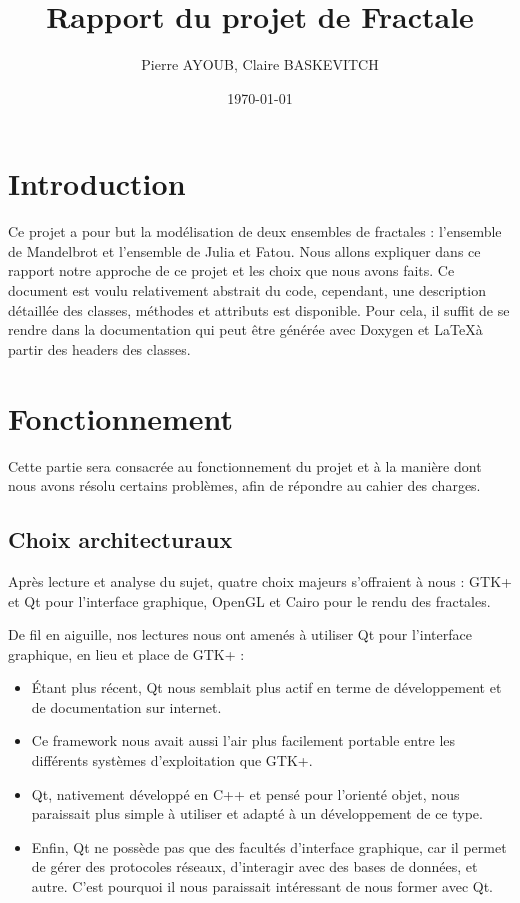 \documentclass[11pt]{article}
\title{Rapport du projet de Fractale}
\author{Pierre AYOUB, Claire BASKEVITCH}
\date\today
\begin{document}
\maketitle

\section{Introduction}

Ce projet a pour but la modélisation de deux ensembles de fractales : l'ensemble
de Mandelbrot et l'ensemble de Julia et Fatou. Nous allons expliquer dans ce
rapport notre approche de ce projet et les choix que nous avons faits. Ce
document est voulu relativement abstrait du code, cependant, une description
détaillée des classes, méthodes et attributs est disponible. Pour cela, il
suffit de se rendre dans la documentation qui peut être générée avec Doxygen et
\LaTeX à partir des headers des classes.

\section{Fonctionnement}

Cette partie sera consacrée au fonctionnement du projet et à la manière dont
nous avons résolu certains problèmes, afin de répondre au cahier des charges.

\subsection{Choix architecturaux}

Après lecture et analyse du sujet, quatre choix majeurs s'offraient à nous :
GTK+ et Qt pour l'interface graphique, OpenGL et Cairo pour le rendu des
fractales.

De fil en aiguille, nos lectures nous ont amenés à utiliser Qt pour l'interface
graphique, en lieu et place de GTK+ :
\begin{itemize}
    \item Étant plus récent, Qt nous semblait plus actif en terme de
        développement et de documentation sur internet.
    \item Ce framework nous avait aussi l'air plus facilement portable entre les
        différents systèmes d'exploitation que GTK+.
    \item Qt, nativement développé en C++ et pensé pour l'orienté objet, nous
        paraissait plus simple à utiliser et adapté à un développement de ce
        type.
    \item Enfin, Qt ne possède pas que des facultés d'interface graphique, car
        il permet de gérer des protocoles réseaux, d'interagir avec des bases de
        données, et autre. C'est pourquoi il nous paraissait intéressant de nous
        former avec Qt.
\end{itemize}
\end{document}
